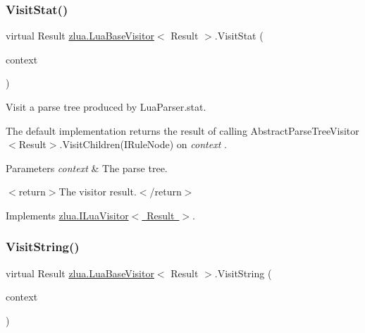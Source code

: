\mbox{\label{classzlua_1_1_lua_base_visitor_a64a5b6fe7b4450d97a48968ddbc02a23}} 
\subsubsection{\texorpdfstring{Visit\+Stat()}{VisitStat()}}
{\footnotesize\ttfamily virtual Result \mbox{\hyperlink{classzlua_1_1_lua_base_visitor}{zlua.\+Lua\+Base\+Visitor}}$<$ Result $>$.Visit\+Stat (\begin{DoxyParamCaption}\item[{\mbox{[}\+Not\+Null\mbox{]} \mbox{\hyperlink{classzlua_1_1_lua_parser_1_1_stat_context}{Lua\+Parser.\+Stat\+Context}}}]{context }\end{DoxyParamCaption})\hspace{0.3cm}{\ttfamily [virtual]}}



Visit a parse tree produced by Lua\+Parser.\+stat. 

The default implementation returns the result of calling Abstract\+Parse\+Tree\+Visitor$<$\+Result$>$.\+Visit\+Children(\+I\+Rule\+Node) on {\itshape context} . 


\begin{DoxyParams}{Parameters}
{\em context} & The parse tree.\\
\hline
\end{DoxyParams}
$<$return$>$The visitor result.$<$/return$>$ 

Implements \mbox{\hyperlink{interfacezlua_1_1_i_lua_visitor_a8d7c64b132803afd5d1fd6601c273f76}{zlua.\+I\+Lua\+Visitor$<$ Result $>$}}.

\mbox{\label{classzlua_1_1_lua_base_visitor_a124ac677211caa574c4c2695e5428538}} 
\subsubsection{\texorpdfstring{Visit\+String()}{VisitString()}}
{\footnotesize\ttfamily virtual Result \mbox{\hyperlink{classzlua_1_1_lua_base_visitor}{zlua.\+Lua\+Base\+Visitor}}$<$ Result $>$.Visit\+String (\begin{DoxyParamCaption}\item[{\mbox{[}\+Not\+Null\mbox{]} \mbox{\hyperlink{classzlua_1_1_lua_parser_1_1_string_context}{Lua\+Parser.\+String\+Context}}}]{context }\end{DoxyParamCaption})\hspace{0.3cm}{\ttfamily [virtual]}}



